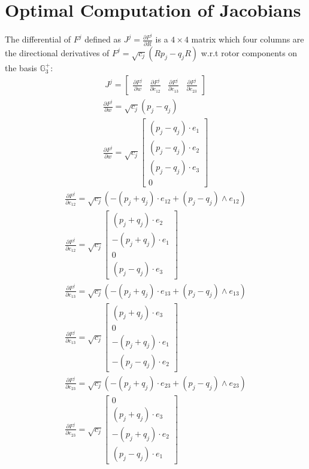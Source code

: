 \documentclass{birkjour}
\numberwithin{equation}{section}
\begin{document}
\section{Optimal Computation of Jacobians}

The differential of $F^j$ defined as $J^j = \frac{\partial F^j}{\partial R}$ is a $4\times4$ matrix which four columns are the directional derivatives of $F^j = \sqrt{c_j} (R p_j - q_j R)$ w.r.t rotor components on the basis $\mathbb{G}^{+}_3$:
\begin{eqnarray*}
J^j = \left[\begin{array}{cccc}\frac{\partial F^j}{\partial w} & \frac{\partial F^j}{\partial e_{12}} & \frac{\partial F^j}{\partial e_{13}} & \frac{\partial F^j}{\partial e_{23}}\end{array}\right]
\end{eqnarray*}
\begin{eqnarray*}
\frac{\partial F^j}{\partial w} = \sqrt{c_j} (p_j - q_j)\\
\frac{\partial F^j}{\partial w} = \sqrt{c_j}
\left[\begin{array}{c}(p_j - q_j) \cdot e_1 \\ (p_j - q_j) \cdot e_2 \\ (p_j - q_j) \cdot e_3 \\ 0\end{array}\right]
\end{eqnarray*}
\begin{eqnarray*}
\frac{\partial F^j}{\partial e_{12}} = \sqrt{c_j} (-(p_j+q_j) \cdot e_{12} + (p_j-q_j) \wedge e_{12})\\
\frac{\partial F^j}{\partial e_{12}} = \sqrt{c_j}
\left[\begin{array}{c}(p_j + q_j) \cdot e_2 \\ -(p_j + q_j) \cdot e_1 \\ 0 \\ (p_j - q_j) \cdot e_3\end{array}\right]
\end{eqnarray*}
\begin{eqnarray*}
\frac{\partial F^j}{\partial e_{13}} = \sqrt{c_j} (-(p_j  + q_j) \cdot e_{13} + (p_j - q_j) \wedge e_{13})\\
\frac{\partial F^j}{\partial e_{13}} = \sqrt{c_j}
\left[\begin{array}{c}(p_j  + q_j) \cdot e_3 \\ 0 \\ -(p_j  + q_j) \cdot e_1 \\ -(p_j - q_j) \cdot e_2\end{array}\right]
\end{eqnarray*}
\begin{eqnarray*}
\frac{\partial F^j}{\partial e_{23}} = \sqrt{c_j} (-(p_j + q_j) \cdot e_{23} + (p_j - q_j) \wedge e_{23})\\
\frac{\partial F^j}{\partial e_{23}} = \sqrt{c_j}
\left[\begin{array}{c} 0 \\ (p_j  + q_j) \cdot e_3 \\ -(p_j  + q_j) \cdot e_2 \\ (p_j - q_j) \cdot e_1\end{array}\right]
\end{eqnarray*}
\end{document}
